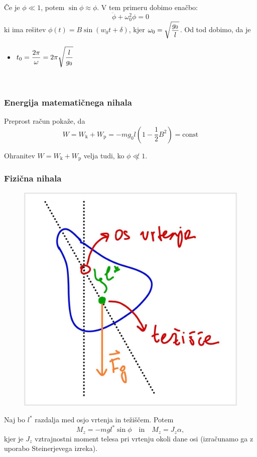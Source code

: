 Če je \(\phi \ll 1\), potem \(\sin \phi \approx \phi\). V tem primeru dobimo enačbo:
\[\boxed{\ddot{\phi} + \omega_0^2 \phi = 0}\]
ki ima rešitev \(\phi(t) = B \sin(w_0t + \delta)\), kjer \(\displaystyle \omega_0 = \sqrt{\frac{g_0}{l}}\). Od tod dobimo, da je 
\begin{itemize}
    \item \(\displaystyle t_0 = \frac{2 \pi}{\omega} = 2 \pi \sqrt{\frac{l}{g_0}}\)
\end{itemize}
\ 
\\

\subsubsection*{Energija matematičnega nihala}
Preprost račun pokaže, da 
\[\boxed{W = W_\text{k} + W_\text{p} = -mg_0l(1 - \frac{1}{2}B^2) = \text{const}}\]

\begin{opomba}
    Ohranitev \(W = W_\text{k} + W_\text{p}\) velja tudi, ko \(\phi \not \ll 1\).
\end{opomba}

\subsubsection*{Fizična nihala}
\begin{figure}
    \includegraphics[width=0.9\linewidth]{img/01_005.jpg} 
\end{figure}
Naj bo \(l^*\) razdalja med osjo vrtenja in težiščem. Potem 
\[M_z = -mgl^* \sin \phi \quad \text{in} \quad M_z = J_z \alpha,\]
kjer je \(J_z\) vztrajnostni moment telesa pri vrtenju okoli dane osi (izračunamo ga z uporabo Steinerjevega izreka).

